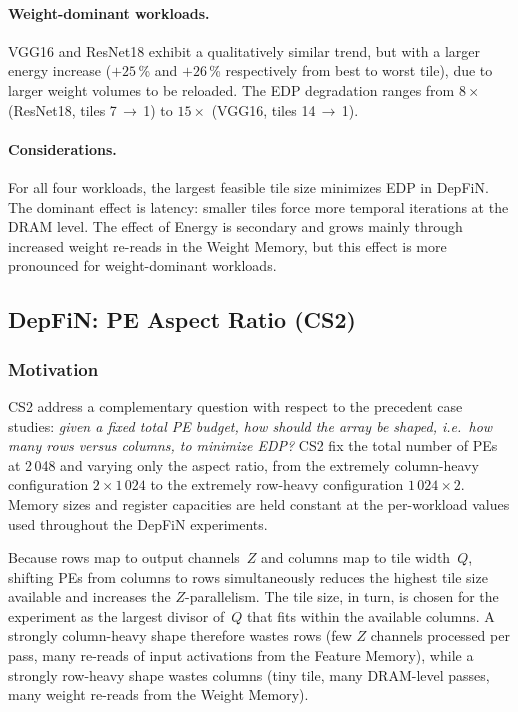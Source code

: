 \paragraph{Weight-dominant workloads.}
VGG16 and ResNet18 exhibit a qualitatively similar trend, but with a
larger energy increase ($+25$\,\% and $+26$\,\% respectively from best
to worst tile), due to larger weight volumes to be reloaded.
The EDP degradation ranges from $8\times$ (ResNet18, tiles 7\,$\to$\,1)
to $15\times$ (VGG16, tiles 14\,$\to$\,1).

\paragraph{Considerations.}

For all four workloads, the largest feasible tile size minimizes EDP in DepFiN.
The dominant effect is latency: smaller tiles force more temporal
iterations at the DRAM level.
The effect of Energy is secondary and grows mainly through increased weight re-reads in the Weight Memory, but this effect is more pronounced for
weight-dominant workloads.
\subsection{DepFiN: PE Aspect Ratio (CS2)}
\label{sec:cs4-aspect}

\subsubsection{Motivation}
CS2 address a complementary question with respect to the precedent case studies:
\emph{given a fixed total PE budget, how should the array be shaped,
i.e.\ how many rows versus columns, to minimize EDP?}
CS2 fix the total number of PEs at
2\,048 and varying only the aspect ratio, from the extremely
column-heavy configuration $2 \times 1\,024$ to the extremely
row-heavy configuration $1\,024 \times 2$.
Memory sizes and register capacities are held constant at the
per-workload values used throughout the DepFiN experiments.

Because rows map to output channels~$Z$ and columns map to tile
width~$Q$, shifting PEs from columns to rows simultaneously reduces
the highest tile size available and increases the $Z$-parallelism.
The tile size, in turn, is chosen for the experiment as the largest divisor
of~$Q$ that fits within the available columns.
A strongly column-heavy shape therefore wastes rows (few $Z$ channels
processed per pass, many re-reads of input activations from the
Feature Memory), while a strongly row-heavy shape wastes columns (tiny
tile, many DRAM-level passes, many weight re-reads from the Weight
Memory).

